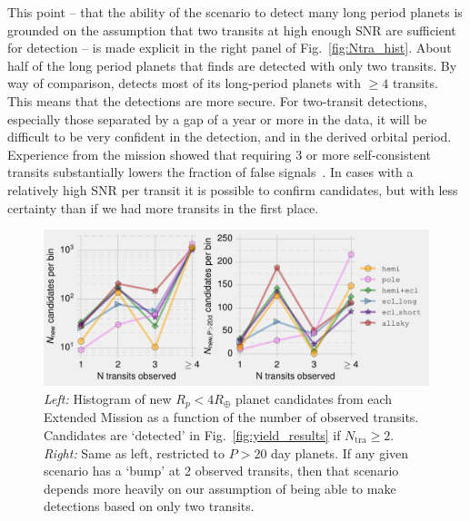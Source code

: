 \begin{enumerate}
	This point -- that the ability of the \hemis\:scenario to detect many long period planets is grounded on the assumption that two transits at high enough SNR are sufficient for detection -- is made explicit in the right panel of Fig.~\ref{fig:Ntra_hist}.
	About half of the long period planets that \hemis\:finds are detected with only two transits.
	By way of comparison, \npole\:detects most of its long-period planets with $\ge 4$ transits.
	This means that the \npole\:detections are more secure.
	For two-transit detections, especially those separated by a gap of a year or more in the \tess data, it will be
        difficult to be very confident in the detection, and in the derived orbital period.
        Experience from the \kepler mission showed that requiring 3 or more self-consistent transits substantially lowers the fraction of false signals~\citep{burke_Q1Q8_2014}.
	In cases with a relatively high SNR per transit it is possible to confirm candidates, but with less certainty than if we had more transits in the first place.
	\begin{figure}[!t]
		\centering
		\includegraphics[scale=1.]{figures/Ntra_histogram.pdf}
		\caption{ \textit{Left:} Histogram of new $R_p<4R_\oplus$ planet candidates from each Extended Mission as a function of the number of observed transits.
		Candidates are `detected' in Fig.~\protect\ref{fig:yield_results} if $N_\mathrm{tra}\geq2$.
		\textit{Right:} Same as left, restricted to $P>20$ day planets.
		If any given scenario has a `bump' at 2 observed transits, then that scenario depends more heavily on our assumption of being able to make detections based on only two transits.
}
\end{figure}
\end{enumerate}
